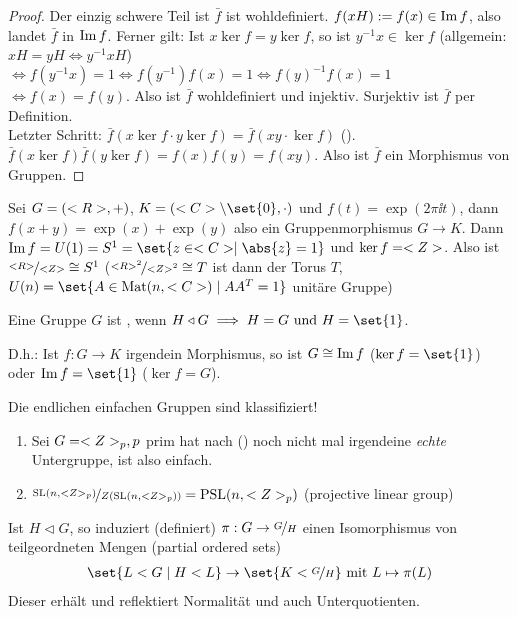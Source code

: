 \begin{proof} %
	Der einzig schwere Teil ist $\bar{f}$ ist wohldefiniert. $f(xH) := f(x) \in \operatorname{Im} f$, also landet $\bar{f}$ in $\operatorname{Im} f$. Ferner gilt: Ist $x \ker f = y \ker f$, so ist $y^{-1}x \in \ker f$ (allgemein: $xH = yH \Leftrightarrow y^{-1}xH$) $\Leftrightarrow f(y^{-1}x) = 1 \Leftrightarrow f(y^{-1})f(x) = 1 \Leftrightarrow f(y)^{-1}f(x) = 1$ $\Leftrightarrow f(x) = f(y)$. Also ist $\bar{f}$ wohldefiniert und injektiv. Surjektiv ist $\bar{f}$ per Definition.\\
	Letzter Schritt: $\bar{f}(x \ker f \cdot y \ker f) = \bar{f}(xy \cdot \ker f)$ (). $\bar{f}(x \ker f)\bar{f}(y\ker f) = f(x)f(y) = f(xy)$. Also ist $\bar{f}$ ein Morphismus von Gruppen.
\end{proof}
\begin{example}
	Sei $G = (<R>, +)$, $K = (\C\setminus \set{0},\cdot)$ und $f(t) = \exp(2\pi \ii t)$, dann $f(x+y) = \exp(x) + \exp(y)$ also ein Gruppenmorphismus $G \to K$. Dann $\Image f = U(1) = S^1 = \set{z \in \C \mid \abs{z} = 1}$ und $\ker f = <Z>$. Also ist $\lnkset{\R}{\Z} \cong S^1$ ($\lnkset{\R^2}{\Z^2} \cong T$ ist dann der Torus $T$, $U(n) = \set{A \in \Mat(n, \C) \mid AA^T = 1}$ unitäre Gruppe)
\end{example}
\begin{definition}
	Eine Gruppe $G$ ist , wenn $H \lhd G \implies H = G \und H = \set{1}$.
\end{definition}
\begin{*remark}
	D.h.: Ist $f: G \to K$ irgendein Morphismus, so ist $G \cong \operatorname{Im} f$ ($\ker f = \set{1}$) oder $\Image f = \set{1}$ ($\ker f = G$).
\end{*remark}
Die endlichen einfachen Gruppen sind klassifiziert!
\begin{example}
	\begin{enumerate}
		\item Sei $G = <Z>_p, p$ prim hat nach  () noch nicht mal irgendeine \emph{echte} Untergruppe, ist also einfach.
		\item $\lnkset{\SL(n, \Z_p)}{Z(\SL(n, \Z_p))} = \PSL(n, \Z_p)$ (projective linear group)
	\end{enumerate}
\end{example}
\begin{proposition}[Korrespondenztheorem]
	Ist $H \lhd G$, so induziert (definiert) $\pi: G \to \lnkset{G}{H}$ einen Isomorphismus von teilgeordneten Mengen (partial ordered sets)
	\begin{align*}
		\set{L < G \mid H < L} \to \set{K < \lnkset{G}{H}} \mit L \mapsto \pi(L)
	\end{align*}
	Dieser erhält und reflektiert Normalität und auch Unterquotienten. 
\end{proposition}
